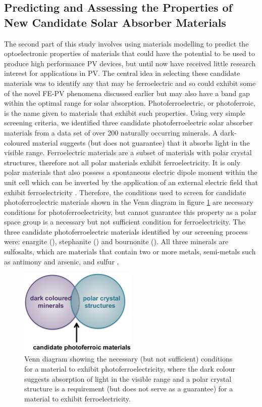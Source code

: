 \subsection{Predicting and Assessing the Properties of New Candidate Solar Absorber Materials}
The second part of this study involves using materials modelling to predict the optoelectronic properties of materials that could have the potential to be used to produce high performance PV devices, but until now have received little research interest for applications in PV.  The central idea in selecting these candidate materials was to identify any that may be ferroelectric and so could exhibit some of the novel FE-PV phenomena discussed earlier but may also have a band gap within the optimal range for solar absorption. Photoferroelectric, or photoferroic, is the name given to materials that exhibit such properties. 
Using very simple screening criteria, we identified three candidate photoferroelectric solar absorber materials from a data set of over 200 naturally occurring minerals. 
A dark-coloured material suggests (but does not guarantee) that it absorbs light in the visible range. Ferroelectric materials are a subset of materials with polar crystal structures, therefore not all polar materials exhibit ferroelectricity. It is only polar materials that also possess a spontaneous electric dipole moment within the unit cell which can be inverted by the application of an external electric field that exhibit ferroelectricity \cite{FE_subset}. 
Therefore, the conditions used to screen for candidate photoferroelectric materials shown in the Venn diagram in figure \ref{vd} are necessary conditions for photoferroelectricity, but cannot guarantee this property as a polar space group is a necessary but not sufficient condition for ferroelectricity.
The three candidate photoferroelectric materials identified by our screening process were: enargite (\enargite), stephanite (\stephanite) and bournonite (\bournonite). All three minerals are sulfosalts, which are materials that contain two or more metals, semi-metals such as antimony and arsenic, and sulfur \cite{DK}. \\

\begin{figure}[h!]
  \centering
    \includegraphics[width=0.5\textwidth]{figures/venn_diagram.png}
    \caption{Venn diagram showing the necessary (but not sufficient) conditions for a material to exhibit photoferroelectricity, where the dark colour suggests absorption of light in the visible range and a polar crystal structure is a requirement (but does not serve as a guarantee) for a material to exhibit ferroelectricity.}
  \label{vd}
\end{figure}

